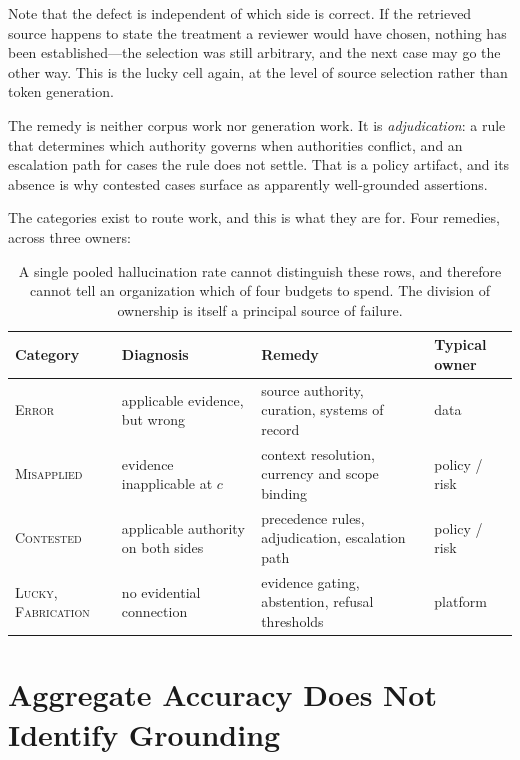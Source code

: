 Note that the defect is independent of which side is correct. If the retrieved source
happens to state the treatment a reviewer would have chosen, nothing has been
established---the selection was still arbitrary, and the next case may go the other
way. This is the lucky cell again, at the level of source selection rather than token
generation.

The remedy is neither corpus work nor generation work. It is \emph{adjudication}: a
rule that determines which authority governs when authorities conflict, and an
escalation path for cases the rule does not settle. That is a policy artifact, and its
absence is why contested cases surface as apparently well-grounded assertions.

The categories exist to route work, and this is what they are for. Four remedies,
across three owners:
\label{sec:remedies}

\begin{table}[ht]
  \centering
  \begin{tabular}{@{}>{\raggedright\arraybackslash}p{2.6cm}>{\raggedright\arraybackslash}p{4.0cm}>{\raggedright\arraybackslash}p{4.4cm}>{\raggedright\arraybackslash}p{2.3cm}@{}}
    \toprule
    Category & Diagnosis & Remedy & Typical owner \\
    \midrule
    \textsc{Error}
      & applicable evidence, but wrong
      & source authority, curation, systems of record
      & data \\
    \addlinespace
    \textsc{Misapplied}
      & evidence inapplicable at $c$
      & context resolution, currency and scope binding
      & policy / risk \\
    \addlinespace
    \textsc{Contested}
      & applicable authority on both sides
      & precedence rules, adjudication, escalation path
      & policy / risk \\
    \addlinespace
    \textsc{Lucky}, \textsc{Fabrication}
      & no evidential connection
      & evidence gating, abstention, refusal thresholds
      & platform \\
    \bottomrule
  \end{tabular}
  \caption{A single pooled hallucination rate cannot distinguish these rows, and
    therefore cannot tell an organization which of four budgets to spend.
    The division of ownership is itself
    a principal source of failure.}
  \label{tab:remedies}
\end{table}

\section{Aggregate Accuracy Does Not Identify Grounding}
\label{sec:independence}

